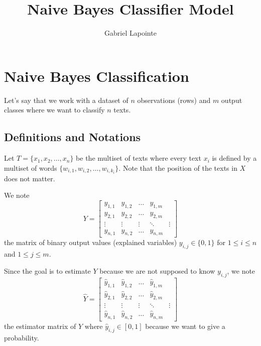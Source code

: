 \documentclass{article}
\title{Naive Bayes Classifier Model}
\author{Gabriel Lapointe}
\begin{document}
\section{Naive Bayes Classification}
Let's say that we work with a dataset of $n$ observations (rows) and $m$ output classes where we want to classify $n$ texts.

\subsection{Definitions and Notations}
Let $T = \{x_1,x_2,\ldots,x_n\}$ be the multiset of texts where every text $x_i$ is defined by a multiset of words $\{w_{i,1}, w_{i,2}, \ldots, w_{i,k_i}\}$. Note that the position of the texts in $X$ does not matter.

We note 
\begin{equation} \label{eq:ExplainedVariableMatrix}
Y =\begin{bmatrix}
	    y_{1,1}      & y_{1,2}      & \ldots & y_{1,m} \\
	    y_{2,1} & y_{2,2} & \ldots & y_{2,m} \\
	    \vdots       & \vdots       & \vdots        & \ddots & \vdots \\
	    y_{n,1}  & y_{n,2}  & \ldots & y_{n,m}
	\end{bmatrix}
\end{equation}
the matrix of binary output values (explained variables) $y_{i,j} \in \{0,1\}$ for $1 \leq i \leq n$ and $1 \leq j \leq m$.

Since the goal is to estimate $Y$ because we are not supposed to know $y_{i,j}$, we note 
\begin{equation} \label{eq:EstimatorMatrix}
\widehat{Y} =\begin{bmatrix}
	    \widehat{y}_{1,1}      & \widehat{y}_{1,2}      & \ldots & \widehat{y}_{1,m} \\
	    \widehat{y}_{2,1} & \widehat{y}_{2,2} & \ldots & \widehat{y}_{2,m} \\
	    \vdots       & \vdots       & \vdots        & \ddots & \vdots \\
	    \widehat{y}_{n,1}  & \widehat{y}_{n,2}  & \ldots & \widehat{y}_{n,m}
	\end{bmatrix}
\end{equation}
the estimator matrix of $Y$ where $\widehat{y}_{i,j} \in [0,1]$ because we want to give a probability.
\end{document}
